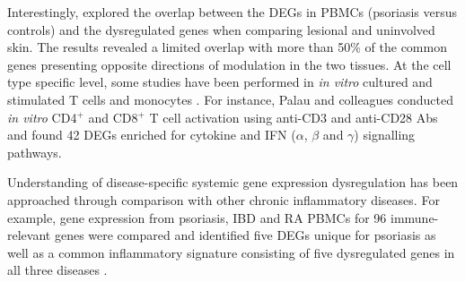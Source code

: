 
Interestingly, \parencite{Coda2012} explored the overlap between the DEGs in PBMCs (psoriasis versus controls) and the dysregulated genes when comparing lesional and uninvolved skin. The results revealed a limited overlap with more than 50\% of the common genes presenting opposite directions of modulation in the two tissues. At the cell type specific level, some studies have been performed in \textit{in vitro} cultured and stimulated T cells and monocytes \parencite{Palau2013, Jung2004}. For instance, Palau and colleagues conducted \textit{in vitro} CD4$^+$ and CD8$^+$ T cell activation using anti-CD3 and anti-CD28 Abs and found 42 DEGs enriched for cytokine and IFN ($\alpha$, $\beta$ and $\gamma$) signalling pathways.

Understanding of disease-specific systemic gene expression dysregulation has been approached through comparison with other chronic inflammatory diseases. For example, gene expression from psoriasis, IBD and RA PBMCs for 96 immune-relevant genes were compared and identified five DEGs unique for psoriasis as well as a common inflammatory signature consisting of five dysregulated genes in all three diseases \parencite{Mesko2015}. 


